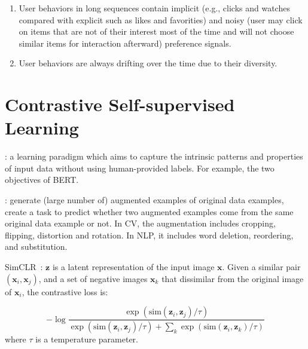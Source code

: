\begin{enumerate}
	\item User behaviors in long sequences contain implicit (e.g., clicks and watches compared with explicit such as likes and favorities) and noisy (user may click on items that are not of their interest most of the time and will not choose similar items for interaction afterward) preference signals.
	\item User behaviors are always drifting over the time due to their diversity.
\end{enumerate}

\section{Contrastive Self-supervised Learning}

: a learning paradigm which aims to capture the intrinsic patterns and properties of input
data without using human-provided labels. For example, the two objectives of BERT.

: generate (large number of) augmented examples of original data examples, create a task to predict whether two augmented examples come from the same original data example or not.
In CV, the augmentation includes cropping, flipping, distortion and rotation.
In NLP, it includes word deletion, reordering, and substitution.

SimCLR~: $\boldsymbol{z}$ is a latent representation of the input image $\boldsymbol{x}$. Given a similar pair $(\boldsymbol{x}_i, \boldsymbol{x}_j)$, and a set of negative images $\boldsymbol{x}_k$ that dissimilar from the original image of $\boldsymbol{x}_i$, the contrastive loss is:

\begin{equation} \label{eq:simclr}
	- \log \frac{\exp(\text{sim}(\boldsymbol{z}_i, \boldsymbol{z}_j)/\tau)}{\exp(\text{sim}(\boldsymbol{z}_i, \boldsymbol{z}_j)/\tau) + \sum_k \exp(\text{sim}(\boldsymbol{z}_i, \boldsymbol{z}_k)/\tau)}
\end{equation}
where $\tau$ is a temperature parameter.


